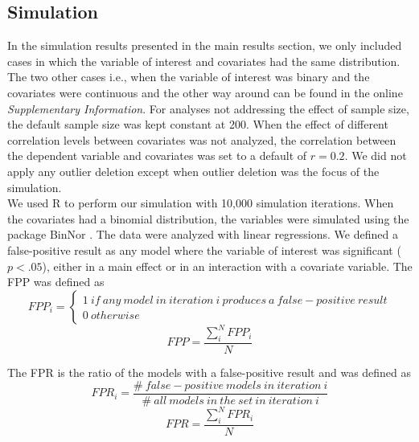 \subsection{Simulation}
In the simulation results presented in the main results section, we only included cases in which the variable of interest and covariates had the same distribution. The two other cases i.e., when the variable of interest was binary and the covariates were continuous and the other way around can be found in the online \textit{Supplementary Information}. For analyses not addressing the effect of sample size, the default sample size was kept constant at 200. When the effect of different correlation levels between covariates was not analyzed, the correlation between the dependent variable and covariates was set to a default of $r=0.2$. We did not apply any outlier deletion except when outlier deletion was the focus of the simulation.\\
We used R \citep{Team2018} to perform our simulation with 10,000 simulation iterations. When the covariates had a binomial distribution, the variables were simulated using the package BinNor \citep{Demirtas2014}. The data were analyzed with linear regressions. We defined a false-positive result as any model where the variable of interest was significant ($p < .05$), either in a main effect or in an interaction with a covariate variable. The FPP was defined as \\

\[FPP_i=\left. \left\{\begin{array}{c}
1\ if\ any\ model\ in\ iteration\ i\ produces\ a\ false-positive\ result \\ 
0\ otherwise\  \end{array}
\right.\] 
\[FPP=\frac{\sum_{i}^{N}{FPP_i}}{N}\] 

The FPR is the ratio of the models with a false-positive result and was defined as \\

\[FPR_i=\frac{\#\ false-positive\ models\ in\ iteration\ i}{\#\ all\ models\ in\ the\ set\ in\ iteration\ i}\] 
\[FPR=\frac{\sum_{i}^{N}{FPR_i}}{N}\] 



